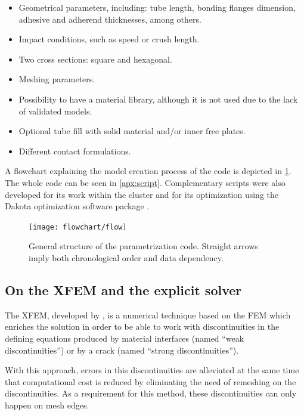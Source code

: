 \documentclass[cmfonts]{witpress}
\begin{document}
\begin{itemize}
	\item Geometrical parameters, including: tube length, bonding flanges dimension, adhesive and adherend thicknesses, among others.

	\item Impact conditions, such as speed or crush length.

	\item Two cross sections: square and hexagonal.

	\item Meshing parameters.

	\item Possibility to have a material library, although it is not used due to the lack of validated models.

	\item Optional tube fill with solid material and/or inner free plates.

	\item Different contact formulations.
\end{itemize}

A flowchart explaining the model creation process of the code is depicted in \cref{fig:flow}. The whole code can be seen in \cref{apx:script}. Complementary scripts were also developed for its work within the cluster and for its optimization using the Dakota optimization software package \cite{dakota}.

\begin{figure}
	\centering
	\texttt{[image: flowchart/flow]}
	\caption[General structure of the parameterized code.]{General structure of the parametrization code. Straight arrows imply both chronological order and data dependency.}
	\label{fig:flow}
\end{figure}


\subsection{On the \acrlong{XFEM} and the explicit solver}
\label{sec:xfem}

The XFEM, developed by \cite{Moes1999}, is a numerical technique based on the FEM which enriches the solution in order to be able to work with discontinuities in the defining equations produced by material interfaces (named ``weak discontinuities'') or by a crack (named ``strong discontinuities'').

With this approach, errors in this discontinuities are alleviated at the same time that computational cost is reduced by eliminating the need of remeshing on the discontinuities. As a requirement for this method, these discontinuities can only happen on mesh edges.
\end{document}
